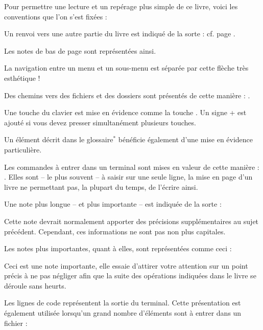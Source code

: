 
\label{RefExemple}
Pour permettre une lecture et un repérage plus simple de ce livre, voici les conventions que l'on s'est fixées :\par
Un renvoi vers une autre partie du livre est indiqué de la sorte : cf. page \pageref{RefExemple}.\par
Les notes de bas de page sont représentées ainsi.\par
La navigation entre un menu et un sous-menu est séparée par cette flèche \FlecheDroite très esthétique !\par
Des chemins vers des fichiers et des dossiers sont présentés de cette manière : .\par
Une touche du clavier est mise en évidence comme la touche . Un signe + est ajouté si vous devez presser simultanément plusieurs touches.\par
Un élément décrit dans le glossaire$^*$ bénéficie également d'une mise en évidence particulière.\par
Les commandes à entrer dans un terminal sont mises en valeur de cette manière : . Elles sont -- le plus souvent -- à saisir sur une seule ligne, la mise en page d'un livre ne permettant pas, la plupart du temps, de l'écrire ainsi.\par
Une note plus longue -- et plus importante -- est indiquée de la sorte : \begin{nota}Cette note devrait normalement apporter des précisions supplémentaires au sujet précédent. Cependant, ces informations ne sont pas non plus capitales.\end{nota}\par
Les notes plus importantes, quant à elles, sont représentées comme ceci : \begin{attention}Ceci est une note importante, elle essaie d'attirer votre attention sur un point précis à ne pas négliger afin que la suite des opérations indiquées dans le livre se déroule sans heurts.\end{attention}\par
Les lignes de code représentent la sortie du terminal. Cette présentation est également utilisée lorsqu'un grand nombre d'éléments sont à entrer dans un fichier : \par
